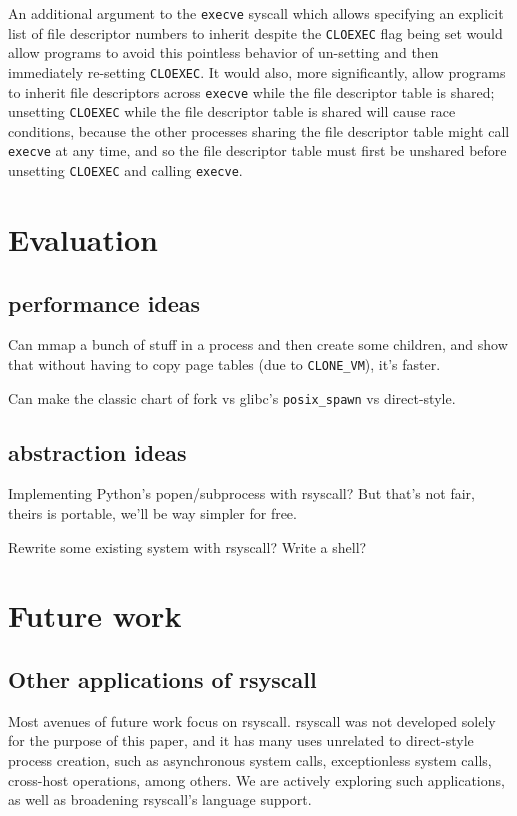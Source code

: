 \documentclass{acmart}
\begin{document}
An additional argument to the \texttt{execve} syscall
which allows specifying an explicit list of file descriptor numbers to inherit despite the \texttt{CLOEXEC} flag being set
would allow programs to avoid this pointless behavior of un-setting and then immediately re-setting \texttt{CLOEXEC}.
It would also, more significantly, allow programs to inherit file descriptors across \texttt{execve}
while the file descriptor table is shared;
unsetting \texttt{CLOEXEC} while the file descriptor table is shared will cause race conditions,
because the other processes sharing the file descriptor table might call \texttt{execve} at any time,
and so the file descriptor table must first be unshared before unsetting \texttt{CLOEXEC} and calling \texttt{execve}.
\section{Evaluation}\label{evaluation}
\subsection{performance ideas}
Can mmap a bunch of stuff in a process and then create some children,
and show that without having to copy page tables (due to \verb|CLONE_VM|), it's faster.

Can make the classic chart of fork vs glibc's \verb|posix_spawn| vs direct-style.
\subsection{abstraction ideas}
Implementing Python's popen/subprocess with rsyscall?
But that's not fair, theirs is portable, we'll be way simpler for free.

Rewrite some existing system with rsyscall?
Write a shell?
\section{Future work}\label{future_work}
\subsection{Other applications of rsyscall}
Most avenues of future work focus on rsyscall.
rsyscall was not developed solely for the purpose of this paper,
and it has many uses unrelated to direct-style process creation,
such as asynchronous system calls, exceptionless system calls\cite{flexsc}, cross-host operations, among others.
We are actively exploring such applications,
as well as broadening rsyscall's language support.
\end{document}
